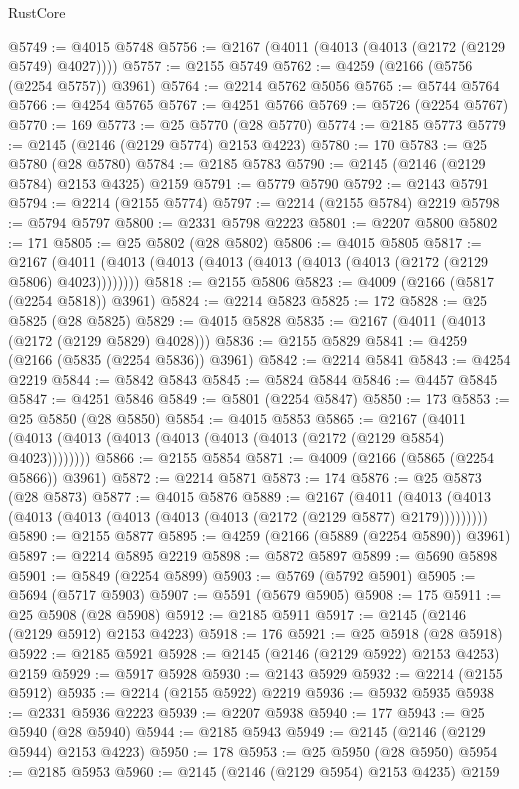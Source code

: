 \begin{lexlean}{RustCore}
\begin{coremodule}
@5749 := @4015 @5748
@5756 := @2167 (@4011 (@4013 (@4013 (@2172 (@2129 @5749) @4027))))
@5757 := @2155 @5749
@5762 := @4259 (@2166 (@5756 (@2254 @5757)) @3961)
@5764 := @2214 @5762 @5056
@5765 := @5744 @5764
@5766 := @4254 @5765
@5767 := @4251 @5766
@5769 := @5726 (@2254 @5767)
@5770 := 169
@5773 := @25 @5770 (@28 @5770)
@5774 := @2185 @5773
@5779 := @2145 (@2146 (@2129 @5774) @2153 @4223)
@5780 := 170
@5783 := @25 @5780 (@28 @5780)
@5784 := @2185 @5783
@5790 := @2145 (@2146 (@2129 @5784) @2153 @4325) @2159
@5791 := @5779 @5790
@5792 := @2143 @5791
@5794 := @2214 (@2155 @5774)
@5797 := @2214 (@2155 @5784) @2219
@5798 := @5794 @5797
@5800 := @2331 @5798 @2223
@5801 := @2207 @5800
@5802 := 171
@5805 := @25 @5802 (@28 @5802)
@5806 := @4015 @5805
@5817 := @2167 (@4011 (@4013 (@4013 (@4013 (@4013 (@4013 (@4013 (@2172 (@2129 @5806) @4023))))))))
@5818 := @2155 @5806
@5823 := @4009 (@2166 (@5817 (@2254 @5818)) @3961)
@5824 := @2214 @5823
@5825 := 172
@5828 := @25 @5825 (@28 @5825)
@5829 := @4015 @5828
@5835 := @2167 (@4011 (@4013 (@2172 (@2129 @5829) @4028)))
@5836 := @2155 @5829
@5841 := @4259 (@2166 (@5835 (@2254 @5836)) @3961)
@5842 := @2214 @5841
@5843 := @4254 @2219
@5844 := @5842 @5843
@5845 := @5824 @5844
@5846 := @4457 @5845
@5847 := @4251 @5846
@5849 := @5801 (@2254 @5847)
@5850 := 173
@5853 := @25 @5850 (@28 @5850)
@5854 := @4015 @5853
@5865 := @2167 (@4011 (@4013 (@4013 (@4013 (@4013 (@4013 (@4013 (@2172 (@2129 @5854) @4023))))))))
@5866 := @2155 @5854
@5871 := @4009 (@2166 (@5865 (@2254 @5866)) @3961)
@5872 := @2214 @5871
@5873 := 174
@5876 := @25 @5873 (@28 @5873)
@5877 := @4015 @5876
@5889 := @2167
    (@4011 (@4013 (@4013 (@4013 (@4013 (@4013 (@4013 (@4013 (@2172 (@2129 @5877) @2179)))))))))
@5890 := @2155 @5877
@5895 := @4259 (@2166 (@5889 (@2254 @5890)) @3961)
@5897 := @2214 @5895 @2219
@5898 := @5872 @5897
@5899 := @5690 @5898
@5901 := @5849 (@2254 @5899)
@5903 := @5769 (@5792 @5901)
@5905 := @5694 (@5717 @5903)
@5907 := @5591 (@5679 @5905)
@5908 := 175
@5911 := @25 @5908 (@28 @5908)
@5912 := @2185 @5911
@5917 := @2145 (@2146 (@2129 @5912) @2153 @4223)
@5918 := 176
@5921 := @25 @5918 (@28 @5918)
@5922 := @2185 @5921
@5928 := @2145 (@2146 (@2129 @5922) @2153 @4253) @2159
@5929 := @5917 @5928
@5930 := @2143 @5929
@5932 := @2214 (@2155 @5912)
@5935 := @2214 (@2155 @5922) @2219
@5936 := @5932 @5935
@5938 := @2331 @5936 @2223
@5939 := @2207 @5938
@5940 := 177
@5943 := @25 @5940 (@28 @5940)
@5944 := @2185 @5943
@5949 := @2145 (@2146 (@2129 @5944) @2153 @4223)
@5950 := 178
@5953 := @25 @5950 (@28 @5950)
@5954 := @2185 @5953
@5960 := @2145 (@2146 (@2129 @5954) @2153 @4235) @2159

\end{coremodule}
\end{lexlean}
